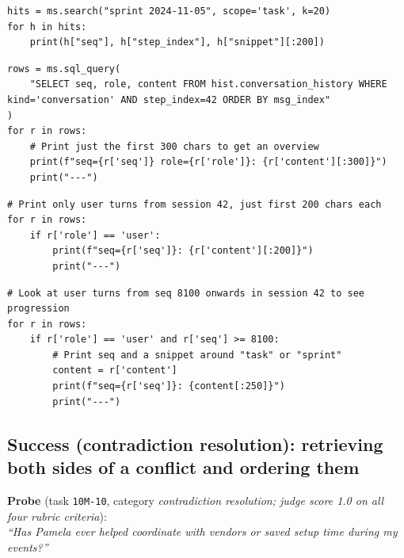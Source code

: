 \begin{lstlisting}[style=scroll, caption={Knowledge update: full-text search; each hit returns its Event Log address (\texttt{seq}), session, and snippet.}, label={lst:ku-c0}]
hits = ms.search("sprint 2024-11-05", scope='task', k=20)
for h in hits:
    print(h["seq"], h["step_index"], h["snippet"][:200])
\end{lstlisting}

\begin{lstlisting}[style=scroll, caption={SQL materialization of Session 42 in address order, bound to the kernel variable \texttt{rows}.}, label={lst:ku-c1}]
rows = ms.sql_query(
    "SELECT seq, role, content FROM hist.conversation_history WHERE kind='conversation' AND step_index=42 ORDER BY msg_index"
)
for r in rows:
    # Print just the first 300 chars to get an overview
    print(f"seq={r['seq']} role={r['role']}: {r['content'][:300]}")
    print("---")
\end{lstlisting}

\begin{lstlisting}[style=scroll, caption={In-kernel filter of the cached \texttt{rows} (user turns only); no Event Log access.}, label={lst:ku-c2}]
# Print only user turns from session 42, just first 200 chars each
for r in rows:
    if r['role'] == 'user':
        print(f"seq={r['seq']}: {r['content'][:200]}")
        print("---")
\end{lstlisting}

\begin{lstlisting}[style=scroll, caption={Second in-kernel filter (user turns, \texttt{seq}${\geq}$8100), exposing the value progression.}, label={lst:ku-c3}]
# Look at user turns from seq 8100 onwards in session 42 to see progression
for r in rows:
    if r['role'] == 'user' and r['seq'] >= 8100:
        # Print seq and a snippet around "task" or "sprint"
        content = r['content']
        print(f"seq={r['seq']}: {content[:250]}")
        print("---")
\end{lstlisting}

\subsection{Success (contradiction resolution): retrieving both sides of a conflict and ordering them}
\label{app:traj-cr}

\begin{tcolorbox}[colback=codebg, colframe=codeframe, boxrule=0.6pt, left=6pt, right=6pt, top=5pt, bottom=5pt]
\textbf{Probe} (task \texttt{10M-10}, category \emph{contradiction
resolution; judge score 1.0 on all four rubric criteria}):\\[3pt]
\emph{``Has Pamela ever helped coordinate with vendors or saved setup time
during my events?''}
\end{tcolorbox}

